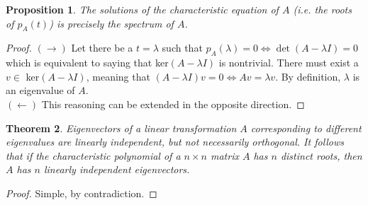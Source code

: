 \documentclass{article}
\newtheorem{theorem}{Theorem}[section]
\newtheorem{proposition}[theorem]{Proposition}
\theoremstyle{remark}
\theoremstyle{definition}
\begin{document}
\begin{proposition}
The solutions of the characteristic equation of $A$ (i.e. the roots of $p_A (t)$) is precisely the spectrum of $A$. 
\end{proposition}

\begin{proof} $(\rightarrow)$ Let there be a $t = \lambda$ such that $p_A (\lambda) = 0 \iff \det{(A - \lambda I)} = 0$ which is equivalent to saying that ker$(A - \lambda I)$ is nontrivial. There must exist a $v \in $ ker$(A - \lambda I)$, meaning that $(A - \lambda I) v = 0 \iff A v = \lambda v$. By definition, $\lambda$ is an eigenvalue of $A$. \\
$(\leftarrow)$ This reasoning can be extended in the opposite direction. 
\end{proof}

\begin{theorem}
Eigenvectors of a linear transformation $A$ corresponding to different eigenvalues are linearly independent, but not necessarily orthogonal. It follows that if the characteristic polynomial of a $n \times n$ matrix $A$ has $n$ distinct roots, then $A$ has $n$ linearly independent eigenvectors. 
\end{theorem}

\begin{proof}
Simple, by contradiction.
\end{proof}
\end{document}
